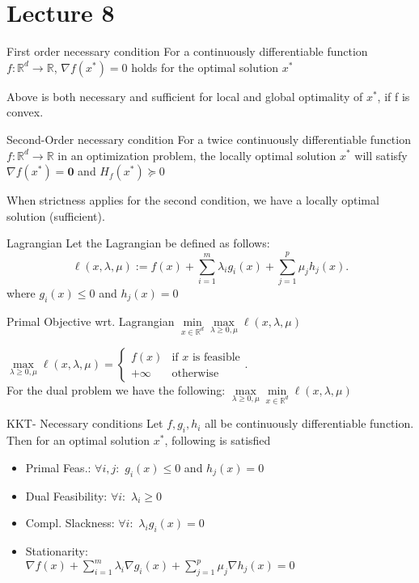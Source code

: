\documentclass[a4paper]{article}
\begin{document}
\section{Lecture 8}
\begin{subbox}{First order necessary condition}
    For a continuously differentiable function $f:\mathbb{R}^d \to \mathbb{R}$, $\nabla f(x^*) = 0$ holds for the optimal solution $x^*$
\end{subbox}

Above is both necessary and sufficient for local and global optimality of $x^*$, if f is convex.

\begin{subbox}{Second-Order necessary condition}
    For a twice continuously differentiable function $f:\mathbb{R}^d \to \mathbb{R}$ in an optimization problem, the locally optimal solution $x^*$ will satisfy $\nabla f(x^*) = \textbf{0}$ and $H_f(x^*) \succeq 0$    
\end{subbox}
When strictness applies for the second condition, we have a locally optimal solution (sufficient).

\begin{mainbox}{Lagrangian}
    Let the Lagrangian be defined as follows: 
    \[
    \ell(x, \lambda, \mu) := f(x) + \sum_{i=1}^{m} \lambda_i g_i(x) + \sum_{j=1}^{p} \mu_j h_j (x)
    .\] where $g_i(x) \leq 0$ and $h_j(x) = 0$   
\end{mainbox}

\begin{subbox}{Primal Objective wrt. Lagrangian}
    $\underset{x\in \mathbb{R}^d}{\min}\underset{\lambda \geq 0, \mu}{\max} \ell(x, \lambda, \mu)$
\end{subbox}
$\underset{\lambda \geq 0, \mu}{\max} \ell(x, \lambda, \mu) = \begin{cases}
    f(x) & \text{if } x \text{ is feasible}\\
    +\infty & \text{otherwise} 
\end{cases}  $. \\
For the dual problem we have the following:
$\underset{\lambda \geq 0, \mu}{\max}\underset{x\in \mathbb{R}^d}{\min} \ell(x, \lambda, \mu)$

\begin{mainbox}{KKT- Necessary conditions}
    Let $f, g_i, h_i$ all be continuously differentiable function. Then for an optimal solution $x^*$, following is satisfied
    \begin{itemize}
        \item Primal Feas.: $\forall i,j: $ $g_i(x) \leq 0$ and $h_j(x) = 0$
        \item Dual Feasibility: $\forall i:$ $\lambda_i \geq 0$
        \item Compl. Slackness: $\forall i: $ $\lambda_i g_i(x) = 0$
        \item Stationarity:\\ $\nabla f(x) + \sum_{i=1}^{m} \lambda_i \nabla g_i(x) + \sum_{j=1}^{p} \mu_j \nabla h_j(x) =0$
    \end{itemize}
      
\end{mainbox}
\end{document}

